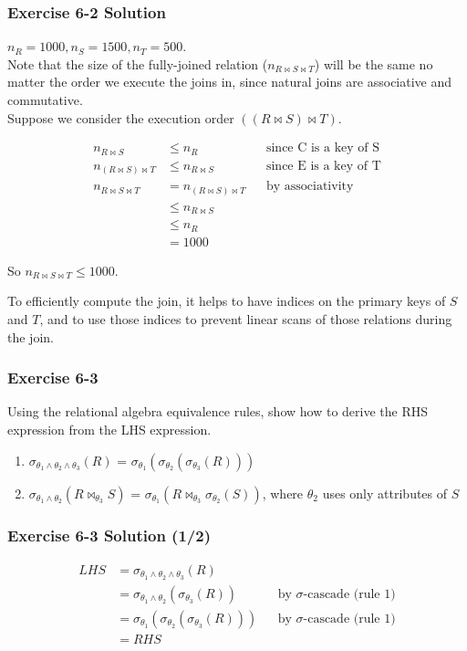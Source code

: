\begin{frame}
\frametitle{Exercise 6-2 Solution}

$n_R = 1000, n_S = 1500, n_T = 500$. \\
Note that the size of the fully-joined relation ($n_{ R \bowtie S \bowtie T }$) will be the same no matter the order we execute the joins in, since natural joins are associative and commutative. \\
Suppose we consider the execution order $((R \bowtie S) \bowtie T)$.

\begin{align*}
  n_{ R \bowtie S } &\le n_R && \text{since C is a key of S} \\
  n_{ (R \bowtie S) \bowtie T } &\le n_{ R \bowtie S } && \text{since E is a key of T} \\
  n_{ R \bowtie S \bowtie T } &= n_{ (R \bowtie S) \bowtie T } && \text{by associativity} \\
  &\le n_{ R \bowtie S } \\
  &\le n_R \\
  &= 1000
\end{align*}

So $n_{ R \bowtie S \bowtie T } \le 1000$.

To efficiently compute the join, it helps to have indices on the primary keys of $S$ and $T$, and to use those indices to prevent linear scans of those relations during the join.

\end{frame}


\begin{frame}
\frametitle{Exercise 6-3}

Using the relational algebra equivalence rules, show how to derive the RHS expression from the LHS expression.

\begin{enumerate}
  \item $\sigma_{\theta_1 \land \theta_2 \land \theta_3}(R)$ = $\sigma_{\theta_1}(\sigma_{\theta_2}(\sigma_{\theta_3}(R)))$
  \item $\sigma_{\theta_1 \land \theta_2}(R \bowtie_{\theta_3} S)$ = $\sigma_{\theta_1}(R \bowtie_{\theta_3} \sigma_{\theta_2}(S))$, where $\theta_2$ uses only attributes of $S$
\end{enumerate}

\end{frame}


\begin{frame}
\frametitle{Exercise 6-3 Solution (1/2)}

\begin{align*}
  LHS &= \sigma_{\theta_1 \land \theta_2 \land \theta_3}(R) \\
  &= \sigma_{\theta_1 \land \theta_2}( \sigma_{\theta_3}(R) ) && \text{by $\sigma$-cascade (rule 1)} \\
  &= \sigma_{\theta_1}(\sigma_{\theta_2}(\sigma_{\theta_3}(R))) && \text{by $\sigma$-cascade (rule 1)} \\
  &= RHS
\end{align*}
\end{frame}


